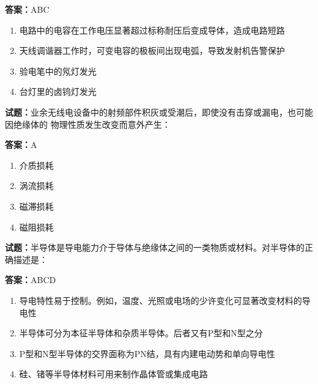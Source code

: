 \documentclass{ctexbook}
\begin{document}
\textbf{答案：}ABC 

\begin{enumerate}[leftmargin=3em]
  \item 电路中的电容在工作电压显著超过标称耐压后变成导体，造成电路短路 

  \item 天线调谐器工作时，可变电容的极板间出现电弧，导致发射机告警保护 

  \item 验电笔中的氖灯发光 

  \item 台灯里的卤钨灯发光 

\end{enumerate}





\vspace{1em}

\textbf{试题：}业余无线电设备中的射频部件积灰或受潮后，即使没有击穿或漏电，也可能因绝缘体的
物理性质发生改变而意外产生： 

\textbf{答案：}A 

\begin{enumerate}[leftmargin=3em]
  \item 介质损耗 

  \item 涡流损耗 

  \item 磁滞损耗 

  \item 磁阻损耗 

\end{enumerate}





\vspace{1em}

\textbf{试题：}半导体是导电能力介于导体与绝缘体之间的一类物质或材料。对半导体的正确描述是： 

\textbf{答案：}ABCD 

\begin{enumerate}[leftmargin=3em]
  \item 导电特性易于控制。例如，温度、光照或电场的少许变化可显著改变材料的导电性 

  \item 半导体可分为本征半导体和杂质半导体。后者又有P型和N型之分 

  \item P型和N型半导体的交界面称为PN结，具有内建电动势和单向导电性 

  \item 硅、锗等半导体材料可用来制作晶体管或集成电路 

\end{enumerate}
\end{document}

